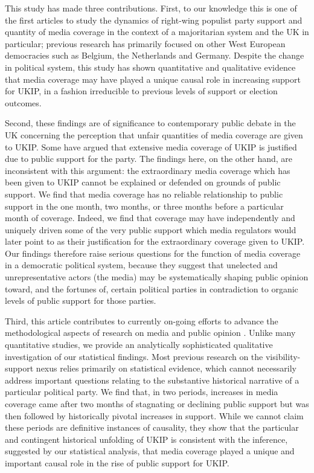 \documentclass[12pt,]{article}
\begin{document}
This study has made three contributions. First, to our knowledge this is
one of the first articles to study the dynamics of right-wing populist
party support and quantity of media coverage in the context of a
majoritarian system and the UK in particular; previous research has
primarily focused on other West European democracies such as Belgium,
the Netherlands and Germany. Despite the change in political system,
this study has shown quantitative and qualitative evidence that media
coverage may have played a unique causal role in increasing support for
UKIP, in a fashion irreducible to previous levels of support or election
outcomes.

Second, these findings are of significance to contemporary public debate
in the UK concerning the perception that unfair quantities of media
coverage are given to UKIP. Some have argued that extensive media
coverage of UKIP is justified due to public support for the party. The
findings here, on the other hand, are inconsistent with this argument:
the extraordinary media coverage which has been given to UKIP cannot be
explained or defended on grounds of public support. We find that media
coverage has no reliable relationship to public support in the one
month, two months, or three months before a particular month of
coverage. Indeed, we find that coverage may have independently and
uniquely driven some of the very public support which media regulators
would later point to as their justification for the extraordinary
coverage given to UKIP. Our findings therefore raise serious questions
for the function of media coverage in a democratic political system,
because they suggest that unelected and unrepresentative actors (the
media) may be systematically shaping public opinion toward, and the
fortunes of, certain political parties in contradiction to organic
levels of public support for those parties.

Third, this article contributes to currently on-going efforts to advance
the methodological aspects of research on media and public opinion
\citep{Vliegenthart:2014di}. Unlike many quantitative studies, we
provide an analytically sophisticated qualitative investigation of our
statistical findings. Most previous research on the visibility-support
nexus relies primarily on statistical evidence, which cannot necessarily
address important questions relating to the substantive historical
narrative of a particular political party. We find that, in two periods,
increases in media coverage came after two months of stagnating or
declining public support but was then followed by historically pivotal
increases in support. While we cannot claim these periods are definitive
instances of causality, they show that the particular and contingent
historical unfolding of UKIP is consistent with the inference, suggested
by our statistical analysis, that media coverage played a unique and
important causal role in the rise of public support for UKIP.

\newpage


\end{document}
